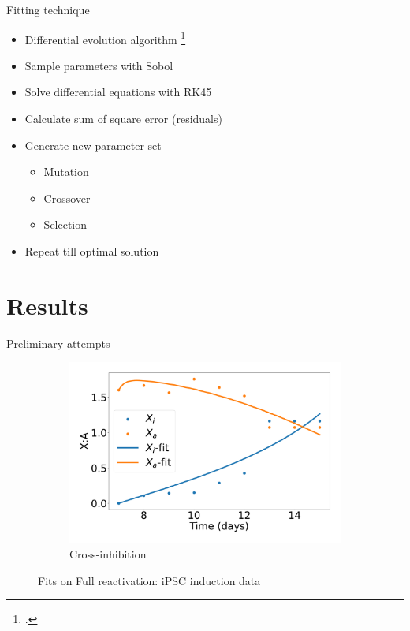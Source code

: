 \documentclass[aspectratio=169,9pt]{beamer}
\begin{document}
    \begin{frame}{Fitting technique}
        \begin{itemize}
            \item Differential evolution algorithm \footcite{DEalgo}
            \item Sample parameters with Sobol
            \item Solve differential equations with RK45
            \item Calculate sum of square error (residuals)
            \item Generate new parameter set
            \begin{itemize}
                \item Mutation
                \item Crossover
                \item Selection
            \end{itemize}
            \item Repeat till optimal solution
        \end{itemize}
    \end{frame}

    \section{Results}
    \begin{frame}{Preliminary attempts}
        \begin{figure}[h]
            \centering
            \begin{subfigure}[b]{0.49\textwidth}
                \centering
                \includegraphics[width=\textwidth]{IINN-iPSC_timeshifted-timeseries}
                \caption{Cross-inhibition}
            \end{subfigure}
            \caption{Fits on Full reactivation: iPSC induction data}
        \end{figure}
    \end{frame}
\end{document}
